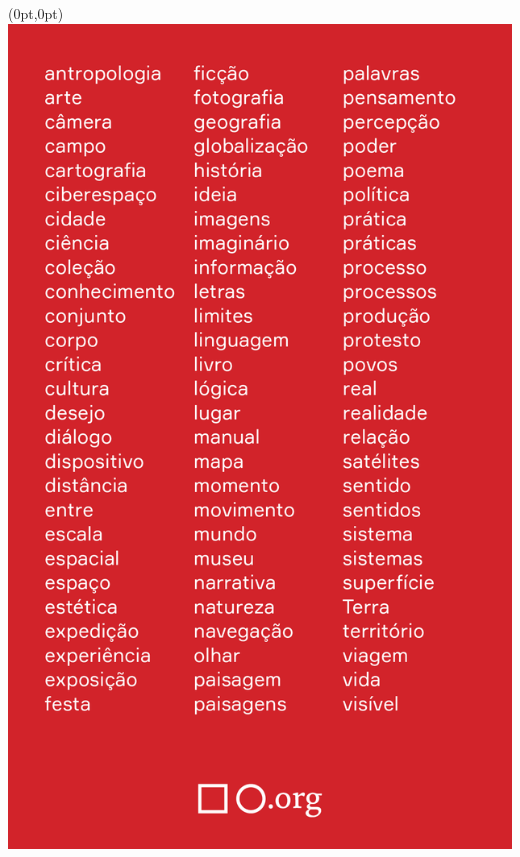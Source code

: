 \pagestyle{quadrado}
\label{quadrado}

\begin{textblock*}{5.625in}(0pt,0pt)%
\vspace*{-3.4cm}
\hspace*{-2.1cm}\includegraphics*[width=160mm]{./imgs/QUADRADO.png}
\end{textblock*}

\pagebreak %

